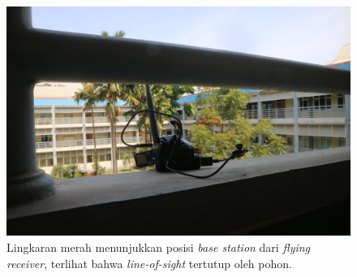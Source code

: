 \begin{figure}[H]
	\includegraphics[scale=0.04]{./assets/Pengujian/PengujianGedungN/LineOfSightKeBaseStation}
	\caption{Lingkaran merah menunjukkan posisi \textit{base station}  dari \textit{flying receiver}, terlihat bahwa \textit{line-of-sight} tertutup oleh pohon.}
\end{figure}
